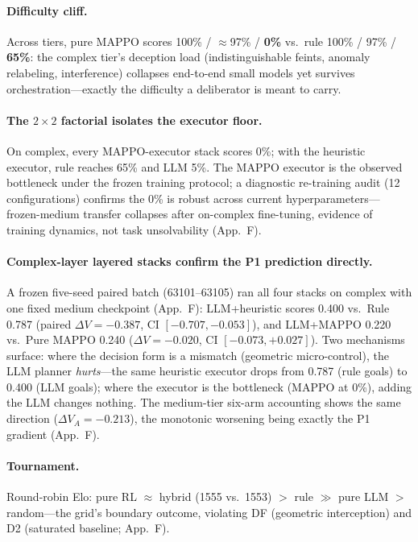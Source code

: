 \documentclass[sigconf,anonymous]{aamas}
\newcommand{\sapp}[1]{App.~#1}
\begin{document}
\paragraph{Difficulty cliff.}
Across tiers, pure MAPPO scores 100\% / $\approx$97\% / \textbf{0\%} vs.\ rule 100\% / 97\% / \textbf{65\%}: the complex tier's deception load (indistinguishable feints, anomaly relabeling, interference) collapses end-to-end small models yet survives orchestration---exactly the difficulty a deliberator is meant to carry.

\paragraph{The $2\times2$ factorial isolates the executor floor.}
On complex, every MAPPO-executor stack scores 0\%; with the heuristic executor, rule reaches 65\% and LLM 5\%. The MAPPO executor is the observed bottleneck under the frozen training protocol; a diagnostic re-training audit (12 configurations) confirms the 0\% is robust across current hyperparameters---frozen-medium transfer collapses after on-complex fine-tuning, evidence of training dynamics, not task unsolvability (\sapp{F}).

\paragraph{Complex-layer layered stacks confirm the P1 prediction directly.}
A frozen five-seed paired batch (63101--63105) ran all four stacks on complex with one fixed medium checkpoint (\sapp{F}): LLM+heuristic scores 0.400 vs.\ Rule 0.787 (paired $\Delta V = -0.387$, CI $[-0.707, -0.053]$), and LLM+MAPPO 0.220 vs.\ Pure MAPPO 0.240 ($\Delta V = -0.020$, CI $[-0.073, +0.027]$). Two mechanisms surface: where the decision form is a mismatch (geometric micro-control), the LLM planner \emph{hurts}---the same heuristic executor drops from 0.787 (rule goals) to 0.400 (LLM goals); where the executor is the bottleneck (MAPPO at 0\%), adding the LLM changes nothing. The medium-tier six-arm accounting shows the same direction ($\Delta V_A = -0.213$), the monotonic worsening being exactly the P1 gradient (\sapp{F}).

\paragraph{Tournament.}
Round-robin Elo: pure RL $\approx$ hybrid (1555 vs.\ 1553) $>$ rule $\gg$ pure LLM $>$ random---the grid's boundary outcome, violating DF (geometric interception) and D2 (saturated baseline; \sapp{F}).
\end{document}
